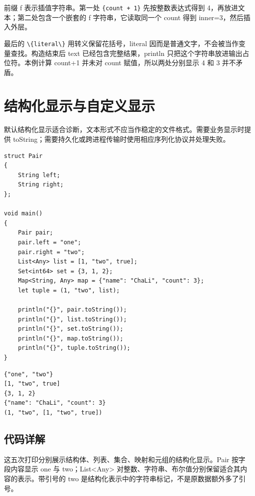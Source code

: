 前缀 f 表示插值字符串。第一处 \texttt{\{count + 1\}} 先按整数表达式得到 4，再放进文本；第二处包含一个嵌套的 f 字符串，它读取同一个 count 得到 inner=3，然后插入外层。

最后的 \texttt{\textbackslash{}\{literal\textbackslash{}\}} 用转义保留花括号，literal 因而是普通文字，不会被当作变量查找。构造结束后 text 已经包含完整结果，println 只把这个字符串放进输出占位符。本例计算 count+1 并未对 count 赋值，所以两处分别显示 4 和 3 并不矛盾。

\section{结构化显示与自定义显示}

默认结构化显示适合诊断，文本形式不应当作稳定的文件格式。需要业务显示时提供 toString；需要持久化或跨进程传输时使用相应序列化协议并处理失败。

\par
\medskip
\begin{lstlisting}[style=chali]
struct Pair
{
    String left;
    String right;
};

void main()
{
    Pair pair;
    pair.left = "one";
    pair.right = "two";
    List<Any> list = [1, "two", true];
    Set<int64> set = {3, 1, 2};
    Map<String, Any> map = {"name": "ChaLi", "count": 3};
    let tuple = (1, "two", list);

    println("{}", pair.toString());
    println("{}", list.toString());
    println("{}", set.toString());
    println("{}", map.toString());
    println("{}", tuple.toString());
}
\end{lstlisting}
\par
\medskip

\par
\medskip
\begin{lstlisting}[style=out]
{"one", "two"}
[1, "two", true]
{3, 1, 2}
{"name": "ChaLi", "count": 3}
(1, "two", [1, "two", true])
\end{lstlisting}
\par
\medskip

\subsection*{代码详解}

这五次打印分别展示结构体、列表、集合、映射和元组的结构化显示。Pair 按字段内容显示 one 与 two；List<Any> 对整数、字符串、布尔值分别保留适合其内容的表示。带引号的 two 是结构化表示中的字符串标记，不是原数据额外多了引号。


